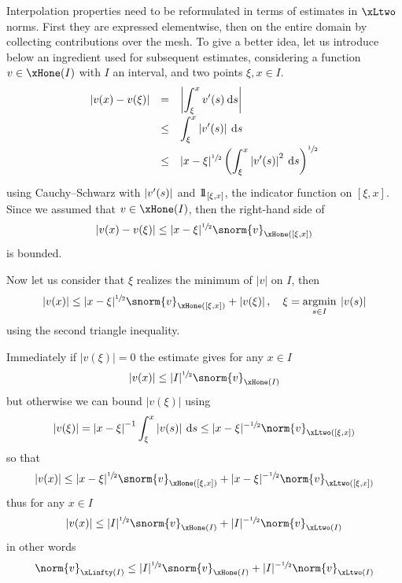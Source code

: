 \medskip
Interpolation properties need to be reformulated in terms of estimates in $\xLtwo$ norms.
First they are expressed elementwise, then on the entire domain by collecting contributions over the mesh.
To give a better idea, let us introduce below an ingredient used for subsequent estimates, considering a function $v\in\xHone(I)$ with $I$ an interval, and two points $\xi, x \in I$.
\begin{equation*}
\begin{array}{lcl}
\left\lvert v(x) - v(\xi) \right\rvert &=&    \displaystyle\left\lvert \int_\xi^x v'(s) \hspace{.5ex}{\mathrm d} s \right\rvert\\[2ex]
                    &\leq& \displaystyle\int_\xi^x \left\lvert v'(s) \right\rvert \hspace{.5ex}{\mathrm d} s\\[2ex]
                    &\leq& \displaystyle|x - \xi|^{\sfrac{1}{2}}\left(\int_\xi^x \left\lvert v'(s) \right\rvert^{2} \hspace{.5ex}{\mathrm d} s\right)^{\sfrac{1}{2}}\\[2ex]
\end{array}
\end{equation*}
using Cauchy--Schwarz with $\left\lvert v'(s) \right\rvert$ and $\displaystyle{1\!\!1_{[\xi, x]}}$, the indicator function on $[\xi, x]$.
Since we assumed that $v\in\xHone(I)$, then the right-hand side of
\begin{equation}\label{eq:interpolation_estimate_1}
\Abs{v(x) - v(\xi)} \leq \displaystyle|x - \xi|^{\sfrac{1}{2}}\snorm{v}_{\xHone([\xi, x])}
\end{equation}
is bounded.

\medskip
Now let us consider that $\xi$ realizes the minimum of $|v|$ on $I$, then
\begin{equation*}
\Abs{v(x)} \leq |x - \xi|^{\sfrac{1}{2}}\snorm{v}_{\xHone([\xi, x])} + \Abs{v(\xi)},\quad \xi = \argmin{s\in I} |v(s)|
\end{equation*}
using the second triangle inequality.

\medskip
Immediately if $|v(\xi)| = 0$ the estimate gives for any $x\in I$
\begin{equation}\label{eq:interpolation_estimate_2}
\Abs{v(x)} \leq |I|^{\sfrac{1}{2}}\snorm{v}_{\xHone(I)}
\end{equation}
but otherwise we can bound $|v(\xi)|$ using
\begin{equation*}
\Abs{v(\xi)} = \Abs{x-\xi}^{-1} \int_\xi^x \Abs{v(s)} \md s \leq |x - \xi|^{-\sfrac{1}{2}}\norm{v}_{\xLtwo([\xi, x])}
\end{equation*}
so that
\begin{equation*}
\Abs{v(x)} \leq |x - \xi|^{\sfrac{1}{2}}\snorm{v}_{\xHone([\xi, x])} + |x - \xi|^{-\sfrac{1}{2}}\norm{v}_{\xLtwo([\xi, x])}
\end{equation*}
thus for any $x\in I$
\begin{equation}\label{eq:interpolation_estimate_2}
\Abs{v(x)} \leq |I|^{\sfrac{1}{2}}\snorm{v}_{\xHone(I)} + |I|^{-\sfrac{1}{2}}\norm{v}_{\xLtwo(I)}
\end{equation}
in other words
\begin{equation}\label{eq:interpolation_estimate_3}
\norm{v}_{\xLinfty(I)} \leq |I|^{\sfrac{1}{2}}\snorm{v}_{\xHone(I)} + |I|^{-\sfrac{1}{2}}\norm{v}_{\xLtwo(I)}
\end{equation}

